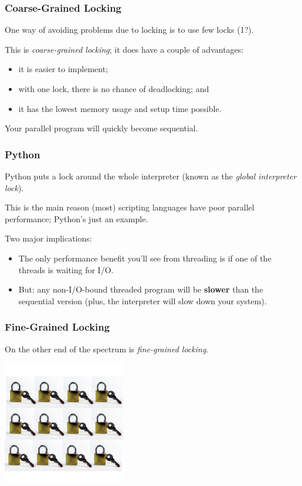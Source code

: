 \begin{frame}
\frametitle{Coarse-Grained Locking}

One way of avoiding problems due to locking is to use few locks
(1?). 

This is \emph{coarse-grained locking}; it does have a couple of advantages:
  \begin{itemize}
    \item it is easier to implement;
    \item with one lock, there is no chance of deadlocking; and
    \item it has the lowest memory usage and setup time possible.
  \end{itemize}

Your parallel program will quickly become sequential.


\end{frame}

\begin{frame}
\frametitle{Python}

Python puts a lock around the whole interpreter (known as the
\emph{global interpreter lock}).  

This is the main reason (most) scripting languages have poor parallel performance; Python's just an example.

Two major implications:
\begin{itemize}
\item The only performance benefit you'll see from threading is if one of the threads is
      waiting for I/O.
\item But: any non-I/O-bound threaded program will be {\bf slower} than the sequential
      version (plus, the interpreter will slow down your system).
\end{itemize}


\end{frame}

\begin{frame}
\frametitle{Fine-Grained Locking}

On the other end of the spectrum is \emph{fine-grained locking}. 


\begin{center}
	\includegraphics[width=0.4\textwidth]{images/tinylocks.jpeg}
\end{center}


\end{frame}

